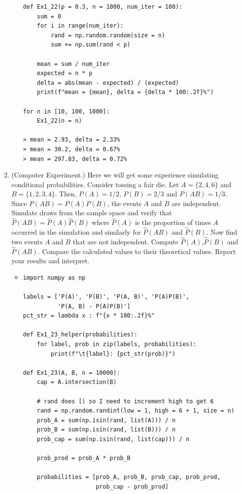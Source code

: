 \documentclass{article}
\begin{document}
\begin{enumerate}
\begin{itemize}
\begin{verbatim}
def Ex1_22(p = 0.3, n = 1000, num_iter = 100):
    sum = 0
    for i in range(num_iter):
        rand = np.random.random(size = n)
        sum += np.sum(rand < p)

    mean = sum / num_iter
    expected = n * p
    delta = abs(mean - expected) / (expected)
    print(f"mean = {mean}, delta = {delta * 100:.2f}%")

for n in [10, 100, 1000]:
    Ex1_22(n = n)

> mean = 2.93, delta = 2.33%
> mean = 30.2, delta = 0.67%
> mean = 297.83, delta = 0.72%
\end{verbatim}
		\end{itemize}
	\item (Computer Experiment.) Here we will get some experience simulating conditional probabilities. Consider tossing a fair die. Let $A = \{2, 4, 6\}$ and $B = \{1, 2, 3, 4\}$. Then, $P(A) = 1/2$, $P(B) = 2/3$ and $P(AB) = 1/3$. Since $P(AB) = P(A)P(B)$, the events $A$ and $B$ are independent. Simulate draws from the sample space and verify that $\hat{P}(AB) = \hat{P}(A)\hat{P}(B)$ where $\hat{P}(A)$ is the proportion of times $A$ occurred in the simulation and similarly for $\hat{P}(AB)$ and $\hat{P}(B)$. Now find two events $A$ and $B$ that are not independent. Compute $\hat{P}(A)$,$\hat{P}(B)$ and $\hat{P}(AB)$. Compare the calculated values to their theoretical values. Report your results and interpret.
	\begin{itemize}
		\item
\begin{verbatim}
import numpy as np

labels = ['P(A)', 'P(B)', 'P(A, B)', 'P(A)P(B)', 
          'P(A, B) - P(A)P(B)']
pct_str = lambda x : f"{x * 100:.2f}%"

def Ex1_23_helper(probabilities):
    for label, prob in zip(labels, probabilities):
        print(f"\t{label}: {pct_str(prob)}")

def Ex1_23(A, B, n = 10000):
    cap = A.intersection(B)

    # rand does [) so I need to increment high to get 6
    rand = np.random.randint(low = 1, high = 6 + 1, size = n)
    prob_A = sum(np.isin(rand, list(A))) / n
    prob_B = sum(np.isin(rand, list(B))) / n
    prob_cap = sum(np.isin(rand, list(cap))) / n

    prob_prod = prob_A * prob_B

    probabilities = [prob_A, prob_B, prob_cap, prob_prod,
                     prob_cap - prob_prod]


\end{verbatim}
\end{itemize}
\end{enumerate}
\end{document}
